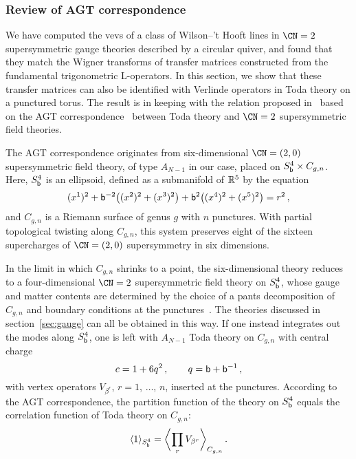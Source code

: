 




\subsubsection{Review of AGT correspondence}

We have computed the vevs of a class of Wilson--'t Hooft lines in
$\CN = 2$ supersymmetric gauge theories described by a circular
quiver, and found that they match the Wigner transforms of transfer
matrices constructed from the fundamental trigonometric L-operators.
In this section, we show that these transfer matrices can also be
identified with Verlinde operators in Toda theory on a punctured
torus.  The result is in keeping with the relation proposed
in~\cite{Ito:2011ea} based on the AGT
correspondence~\cite{Alday:2009aq} between Toda theory and $\CN = 2$
supersymmetric field theories.




The AGT correspondence originates from six-dimensional $\CN = (2,0)$
supersymmetric field theory, of type $A_{N-1}$ in our case, placed on
$S^4_{\mathsf{b}} \times C_{g,n}$.  Here, $S^4_{\mathsf{b}}$ is an ellipsoid, defined as
a submanifold of $\mathbb{R}^5$ by the equation
\begin{equation}
  (x^1)^2
  + \mathsf{b}^{-2} \bigl((x^2)^2 + (x^3)^2\bigr)
  + \mathsf{b}^2 \bigl((x^4)^2 + (x^5)^2\bigr)
  = r^2 \,,
\end{equation}
and $C_{g,n}$ is a Riemann surface of genus $g$ with $n$ punctures.
With partial topological twisting along $C_{g,n}$, this system
preserves eight of the sixteen supercharges of $\CN = (2,0)$
supersymmetry in six dimensions.

In the limit in which $C_{g,n}$ shrinks to a point, the
six-dimensional theory reduces to a four-dimensional $\CN = 2$
supersymmetric field theory on $S^4_{\mathsf{b}}$, whose gauge and matter
contents are determined by the choice of a pants decomposition of
$C_{g,n}$ and boundary conditions at the
punctures~\cite{Gaiotto:2009we, Gaiotto:2009hg}.  The theories
discussed in section~\ref{sec:gauge} can all be obtained in this way.
If one instead integrates out the modes along $S^4_{\mathsf{b}}$, one is left
with $A_{N-1}$ Toda theory on $C_{g,n}$ with central charge
\begin{equation}
  c = 1 + 6q^2 \,,
  \qquad
  q = \mathsf{b} + \mathsf{b}^{-1} \,,
\end{equation}
with vertex operators $V_{\beta^r}$, $r = 1$, $\dotsc$, $n$, inserted
at the punctures.  According to the AGT correspondence, the partition
function of the theory on $S^4_{\mathsf{b}}$ equals the correlation function of
Toda theory on $C_{g,n}$:
\begin{equation}
  \langle 1 \rangle_{S^4_{\mathsf{b}}} = \biggl\langle \prod_r V_{\beta^r} \biggr\rangle_{C_{g,n}} \,.
\end{equation}

